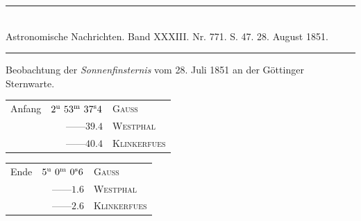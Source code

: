 \clearpage
{}
\begin{center}
\rule{0.55\linewidth}{0.4pt}\\[2pt]
Astronomische Nachrichten. Band XXXIII. Nr. 771. S. 47. 28. August 1851.\\[2pt]
\rule{0.55\linewidth}{0.4pt}
\end{center}
\begin{center}Beobachtung der \emph{Sonnenfinsternis} vom 28. Juli 1851 an der Göttinger Sternwarte.\end{center}

\begin{center}
\begin{tabular}{lrl}
Anfang & $2^{\rm u}\ 53^{\rm m}\ 37^{\rm s}4$ & \textsc{Gauss} \\
 & \mbox{---\quad---}\quad $39.4$ & \textsc{Westphal} \\
 & \mbox{---\quad---}\quad $40.4$ & \textsc{Klinkerfues} \\
\end{tabular}
\end{center}
\begin{center}
\begin{tabular}{lrl}
Ende & $5^{\rm u}\ 0^{\rm m}\ 0^{\rm s}6$ & \textsc{Gauss} \\
 & \mbox{---\quad---}\quad $1.6$ & \textsc{Westphal} \\
 & \mbox{---\quad---}\quad $2.6$ & \textsc{Klinkerfues} \\
\end{tabular}
\end{center}

